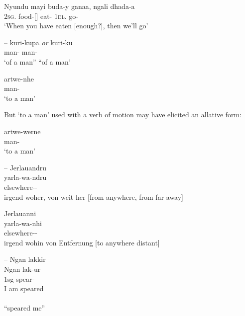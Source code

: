 \documentclass{langscibook}
\begin{document}
\ea
\gll Nyundu mayi buda-y ganaa, ngali dhada-a \\
2\textsc{sg}. food-[] eat-  1\textsc{dl}. go-\\
\glt `When you have eaten [enough?], then we’ll go' \\
\citep[152]{haviland_guugu_1979}
\z





--
\ea
\gll kuri-kupa \textit{or} kuri-ku\\
man- {} man-\\
\glt `of a man” {} “of a man'
\z



\ea
\gll artwe-nhe\\
man-\\
\glt `to a man'
\z

But ‘to a man’ used with a verb of motion may have elicited an allative form:

\ea
\gll artwe-werne\\
man-\\
\glt `to a man'
\z






--
\ea\label{ex:key:2-8}
\glll Jerlauandru\\
yarla-wa-ndru\\
elsewhere--\\
\glt irgend woher, von weit her [from anywhere, from far away] \\
\citep[no pag.]{koch_untitled_1868}
\z

\ea\label{ex:key:2-9}
\glll Jerlauanni\\
yarla-wa-nhi\\
elsewhere--\\
\glt irgend wohin von Entfernung [to anywhere distant] \\
\citep[no pag.]{koch_untitled_1868}
\z




--
\ea
\glll Ngan lakkir\\
Ngan lak-ur\\
1sg spear-\\
\glt I am speared \\
\citep[17]{taplin_grammar_1878} \\
“speared me”
\z
\end{document}

